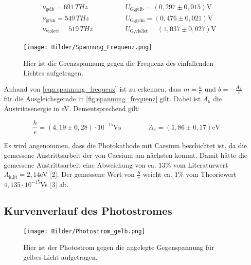 \documentclass[titlepage = firstcover]{scrartcl}
\begin{document}
            \begin{align*}
              &\nu_{\text{gelb}} = 691 \, THz \qquad \qquad &U_\text{G,gelb} = (0,297 \pm 0,015) \text{V} \\
              &\nu_{\text{grün}} = 549 \, THz \qquad \qquad &U_\text{G,grün} = (0,476 \pm 0,021) \text{V} \\
              &\nu_{\text{violett}} = 519 \, THz \qquad \qquad  &U_\text{G,viollet} = (1,037 \pm 0,027) \text{V}
            \end{align*}

            \begin{figure}[h]
              \centering
              \texttt{[image: Bilder/Spannung\_Frequenz.png]}
              \caption{Hier ist die Grenzspannung gegen die Frequenz des einfallenden Lichtes aufgetragen.}
              \label{fig:spannung_frequenz}
            \end{figure}

            \FloatBarrier

            Anhand von \autoref{eqn:spannung_frequenz} ist zu erkennen, dass $m = \frac{h}{e}$ und $b = -\frac{A_{\text{k}}}{e}$ für die Ausgleichsgerade in  \autoref{fig:spannung_frequenz} gilt. Dabei ist $A_{\text{k}}$ die Austrittsenergie in eV. Dementsprechend gilt:

            \begin{equation*}
              \frac{h}{e} = (4,19 \pm 0,28) \cdot 10^{-15} \text{Vs} \qquad \qquad A_{\text{k}} = (1,86 \pm 0,17) \text{eV}
            \end{equation*}

            Es wird angenommen, dass die Photokathode mit Caesium beschichtet ist, da die gemessene Austrittsarbeit der von Caesium am nächsten kommt. Damit hätte die gemessene Austrittsarbeit eine Abweichung von ca. $13$\% vom Literaturwert $A_{\text{k,lit}} = 2,14$eV [2]. Der gemessene Wert von $\frac{h}{e}$ weicht ca. $1$\% vom Theoriewert $4,135 \cdot 10^{-15}$Vs [3] ab.

        \newpage
        \subsection{Kurvenverlauf des Photostromes}
            \begin{figure}[h]
              \centering
              \texttt{[image: Bilder/Photostrom\_gelb.png]}
              \caption{Hier ist der Photostrom gegen die angelegte Gegenspannung für gelbes Licht aufgetragen.}
              \label{fig:spannung_frequenz}
            \end{figure}
\end{document}

